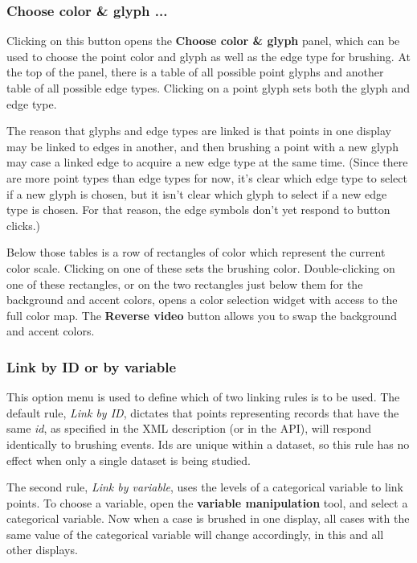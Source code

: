 \documentclass[11pt]{article}
\begin{document}
\subsubsection{Choose color \& glyph ...}

Clicking on this button opens the {\bf Choose color \& glyph} panel,
which can be used to choose the point color and glyph as well as the
edge type for brushing.  At the top of the panel, there is a table of
all possible point glyphs and another table of all possible edge types.
Clicking on a point glyph sets both the glyph and edge type.

The reason that glyphs and edge types are linked is that points in one
display may be linked to edges in another, and then brushing a point
with a new glyph may case a linked edge to acquire a new edge type at
the same time.  (Since there are more point types than edge types for
now, it's clear which edge type to select if a new glyph is chosen,
but it isn't clear which glyph to select if a new edge type is chosen.
For that reason, the edge symbols don't yet respond to button clicks.)

Below those tables is a row of rectangles of color which represent the
current color scale.  Clicking on one of these sets the brushing color.
Double-clicking on one of these rectangles, or on the two rectangles
just below them for the background and accent colors, opens a color
selection widget with access to the full color map.  The {\bf Reverse
video} button allows you to swap the background and accent colors.

\subsubsection{Link by ID or by variable}
\label{LinkingRules}

This option menu is used to define which of two linking rules is to
be used.  The default rule, {\it Link by ID}, dictates that points
representing records that have the same {\it id}, as specified in the XML
description (or in the API), will respond identically to brushing events.
Ids are unique within a dataset, so this rule has no effect when only
a single dataset is being studied.

The second rule, {\it Link by variable}, uses the levels of a categorical
variable to link points.  To choose a variable, open the {\bf variable
manipulation} tool, and select a categorical variable.  Now when a
case is brushed in one display, all cases with the same value of the
categorical variable will change accordingly, in this and all other
displays. 
\end{document}
